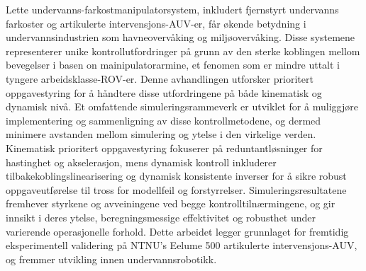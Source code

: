 Lette undervanns-farkostmanipulatorsystem, inkludert fjernstyrt undervanns
farkoster og artikulerte intervensjons-AUV-er, får økende betydning i undervannsindustrien som havneovervåking og miljøovervåking. Disse systemene representerer unike kontrollutfordringer på grunn av den sterke koblingen mellom bevegelser i basen on mainipulatorarmine, et fenomen som er mindre uttalt i tyngere arbeidsklasse-ROV-er. Denne avhandlingen utforsker prioritert oppgavestyring for å håndtere disse utfordringene på både kinematisk og dynamisk nivå. Et omfattende simuleringsrammeverk er utviklet for å muliggjøre implementering og sammenligning av disse kontrollmetodene, og dermed minimere avstanden mellom simulering og ytelse i den virkelige verden.
Kinematisk prioritert oppgavestyring fokuserer på reduntantløsninger for hastinghet og akselerasjon, mens dynamisk kontroll inkluderer tilbakekoblingslinearisering og dynamisk konsistente inverser for å sikre robust oppgaveutførelse til tross for modellfeil og forstyrrelser. Simuleringsresultatene fremhever styrkene og avveiningene ved begge kontrolltilnærmingene, og gir innsikt i deres ytelse, beregningsmessige effektivitet og robusthet under varierende operasjonelle forhold. Dette arbeidet legger grunnlaget for fremtidig eksperimentell validering på NTNU's Eelume 500 artikulerte intervensjons-AUV, og fremmer utvikling innen undervannsrobotikk.
